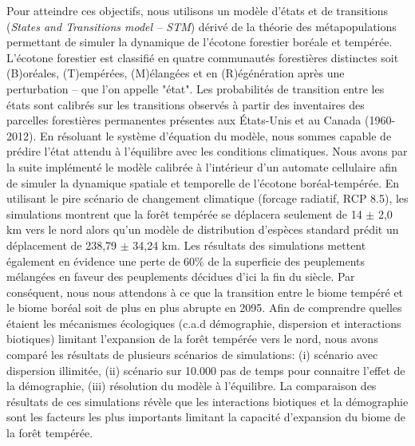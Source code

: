   Pour atteindre ces objectifs, nous utilisons un modèle d'états et de transitions (\textit{States
 and Transitions model -- STM}) dérivé de la théorie des métapopulations permettant de simuler la
 dynamique de l'écotone forestier boréale et tempérée. L'écotone forestier est classifié en quatre
 communautés forestières distinctes soit (B)oréales, (T)empérées, (M)élangées et en (R)égénération
 après une perturbation -- que l'on appelle "état". Les probabilités de transition entre les états
 sont calibrés sur les transitions observés à partir des inventaires des parcelles forestières
 permanentes présentes aux États-Unis et au Canada (1960-2012). En résoluant le système d'équation
 du modèle, nous sommes capable de prédire l'état attendu à l'équilibre avec les conditions
 climatiques. Nous avons par la suite implémenté le modèle calibrée à l'intérieur d'un automate
 cellulaire afin de simuler la dynamique spatiale et temporelle de l'écotone boréal-tempérée. En
 utilisant le pire scénario de changement climatique (forcage radiatif, RCP 8.5), les simulations
 montrent que la forêt tempérée se déplacera seulement de 14 $\pm$ 2,0 km vers le nord alors qu'un
 modèle de distribution d'espèces standard prédit un déplacement de 238,79 $\pm$ 34,24 km. Les
 résultats des simulations mettent également en évidence une perte de 60\% de la superficie des
 peuplements mélangées en faveur des peuplements décidues d’ici la fin du siècle. Par conséquent,
 nous nous attendons à ce que la transition entre le biome tempéré et le biome boréal soit de plus
 en plus abrupte en 2095. Afin de comprendre quelles étaient les mécanismes écologiques (c.a.d
 démographie, dispersion et interactions biotiques) limitant l'expansion de la forêt tempérée vers
 le nord, nous avons comparé les résultats de plusieurs scénarios de simulations: (i) scénario avec
 dispersion illimitée, (ii) scénario sur 10.000 pas de temps pour connaitre l'effet de la
 démographie, (iii) résolution du modèle à l'équilibre. La comparaison des résultats de ces
 simulations révèle que les interactions biotiques et la démographie sont les facteurs les plus
 importants limitant la capacité d'expansion du biome de la forêt tempérée.


